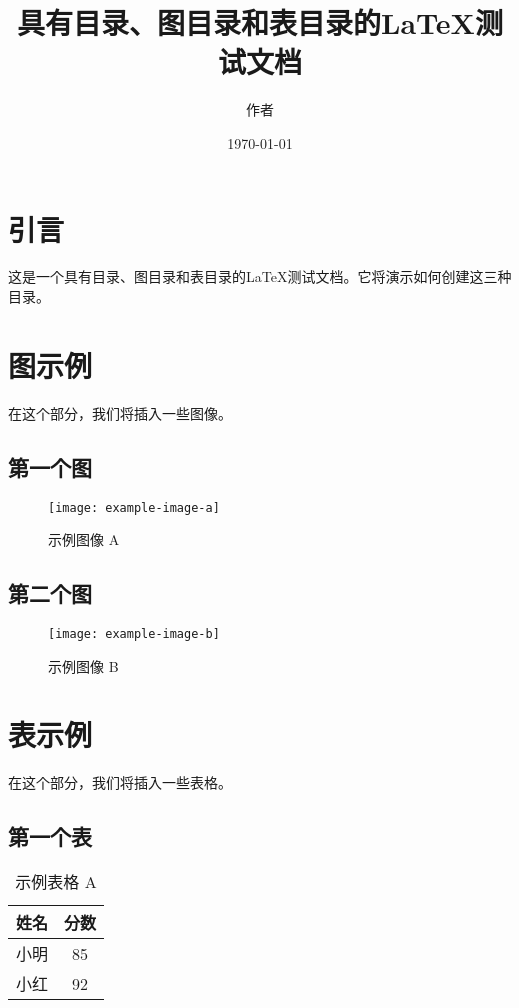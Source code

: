 \documentclass{article}
\begin{document}
\title{具有目录、图目录和表目录的LaTeX测试文档}
\author{作者}
\date{\today}

\maketitle

\tableofcontents %
\listoffigures %
\listoftables %

\section{引言}
这是一个具有目录、图目录和表目录的LaTeX测试文档。它将演示如何创建这三种目录。

\section{图示例}
在这个部分，我们将插入一些图像。

\subsection{第一个图}
\begin{figure}[htb]
    \centering
    \texttt{[image: example-image-a]}
    \caption{示例图像 A}
\end{figure}

\subsection{第二个图}
\begin{figure}[htb]
    \centering
    \texttt{[image: example-image-b]}
    \caption{示例图像 B}
\end{figure}

\section{表示例}
在这个部分，我们将插入一些表格。

\subsection{第一个表}
\begin{table}[htb]
    \centering
    \begin{tabular}{|c|c|}
    \hline
    姓名 & 分数 \\
    \hline
    小明 & 85 \\
    小红 & 92 \\
    \hline
    \end{tabular}
    \caption{示例表格 A}
\end{table}
\end{document}
